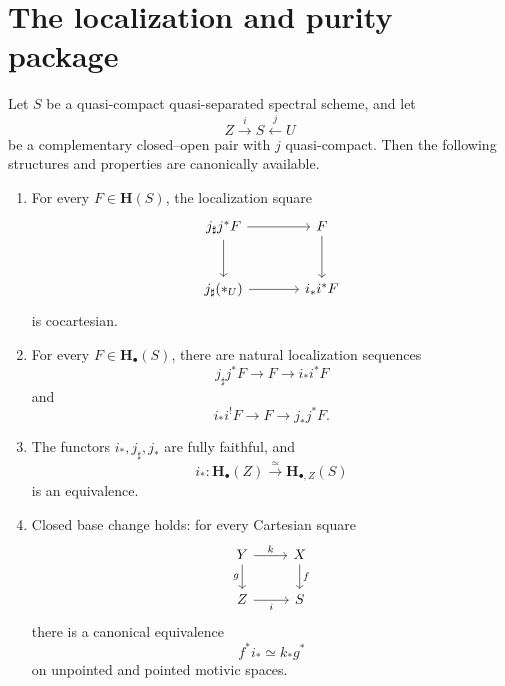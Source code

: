\section{The localization and purity package}
\label{sec:localization-purity-package}


\begin{theorem}
\label{thm:localization-purity-nil-invariance-package}
Let \(S\) be a quasi-compact quasi-separated spectral scheme, and let
\[
    Z
    \xrightarrow{i}
    S
    \xleftarrow{j}
    U
\]
be a complementary closed--open pair with \(j\) quasi-compact.  Then
the following structures and properties are canonically available.
\begin{enumerate}[label=(\roman*)]
    \item For every \(F\in\mathbf H(S)\), the localization square
    \[
    \begin{tikzcd}[column sep=large, row sep=large]
        j_\sharp j^*F
            \arrow[r]
            \arrow[d]
        &
        F
            \arrow[d]
        \\
        j_\sharp(*_U)
            \arrow[r]
        &
        i_*i^*F
    \end{tikzcd}
    \]
    is cocartesian.

    \item For every \(F\in\mathbf H_\bullet(S)\), there are natural
    localization sequences
    \[
        j_\sharp j^*F
        \longrightarrow
        F
        \longrightarrow
        i_*i^*F
    \]
    and
    \[
        i_*i^!F
        \longrightarrow
        F
        \longrightarrow
        j_*j^*F.
    \]

    \item The functors \(i_*,j_\sharp,j_*\) are fully faithful, and
    \[
        i_*
        \colon
        \mathbf H_\bullet(Z)
        \xrightarrow{\simeq}
        \mathbf H_{\bullet,Z}(S)
    \]
    is an equivalence.

    \item Closed base change holds:
    for every Cartesian square
    \[
    \begin{tikzcd}
        Y \arrow[r, "k"] \arrow[d, "g"']
        &
        X \arrow[d, "f"]
        \\
        Z \arrow[r, "i"']
        &
        S
    \end{tikzcd}
    \]
    there is a canonical equivalence
    \[
        f^*i_*
        \simeq
        k_*g^*
    \]
    on unpointed and pointed motivic spaces.


\end{enumerate}
\end{theorem}
